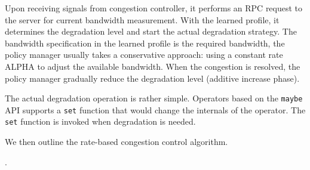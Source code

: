  Upon receiving signals from congestion controller, it
performs an RPC request to the server for current bandwidth measurement. With
the learned profile, it determines the degradation level and start the actual
degradation strategy. The bandwidth specification in the learned profile is the
required bandwidth, the policy manager usually takes a conservative approach:
using a constant rate ALPHA to adjust the available bandwidth. When the
congestion is resolved, the policy manager gradually reduce the degradation
level (additive increase phase).

 The actual degradation operation is rather simple. Operators
based on the \texttt{maybe} API supports a \texttt{set} function that would
change the internals of the operator. The \texttt{set} function is invoked when
degradation is needed.

We then outline the rate-based congestion control algorithm.

.

